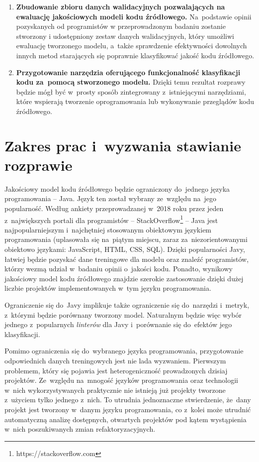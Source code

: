 \documentclass[twoside]{praca}
\begin{document}
\begin{enumerate}
    \item \textbf{Zbudowanie zbioru danych walidacyjnych pozwalających na ewaluację jakościowych modeli kodu źródłowego.} Na~podstawie opinii pozyskanych od programistów w przeprowadzonym badaniu zostanie stworzony i udostępniony zestaw danych walidacyjnych, który umożliwi ewaluację tworzonego modelu, a~także sprawdzenie efektywności dowolnych innych metod starających się poprawnie klasyfikować jakość kodu źródłowego.
    
    \item \textbf{Przygotowanie narzędzia oferującego funkcjonalność klasyfikacji kodu za~pomocą stworzonego modelu.} Dzięki temu rezultat rozprawy będzie mógł być w~prosty sposób zintegrowany z~istniejącymi narzędziami, które wspierają tworzenie oprogramowania lub wykonywanie przeglądów kodu źródłowego.
\end{enumerate}

\section{Zakres prac i~wyzwania stawianie rozprawie}
\label{sec:intro:constraints}

Jakościowy model kodu źródłowego będzie ograniczony do~jednego języka programowania -- Java. Język ten został wybrany ze~względu na~jego popularność. Według ankiety przeprowadzanej w~2018 roku przez jeden z~największych portali dla programistów -- StackOverflow\footnote{https://stackoverflow.com} -- Java jest najpopularniejszym i~najchętniej stosowanym obiektowym językiem programowania \cite{so:survey2018} (uplasowała się na~piątym miejscu, zaraz za~niezorientowanymi obiektowo językami: JavaScript, HTML, CSS, SQL). Dzięki popularności Javy, łatwiej będzie pozyskać dane treningowe dla modelu oraz znaleźć programistów, którzy wezmą udział w~badaniu opinii o~jakości kodu. Ponadto, wynikowy jakościowy model kodu źródłowego znajdzie szerokie zastosowanie dzięki dużej liczbie projektów implementowanych w~tym języku programowania.

Ograniczenie się do~Javy implikuje także ograniczenie się do~narzędzi i~metryk, z~którymi będzie porównany tworzony model. Naturalnym będzie więc wybór jednego z~popularnych \textit{linterów} dla Javy i~porównanie się do~efektów jego klasyfikacji.

Pomimo ograniczenia się do~wybranego języka programowania, przygotowanie odpowiednich danych treningowych jest nie lada wyzwaniem. Pierwszym problemem, który się pojawia jest heterogeniczność prowadzonych dzisiaj projektów. Ze~względu na~mnogość języków programowania oraz technologii w~nich wykorzystywanych praktycznie nie istnieją już projekty tworzone z~użyciem tylko jednego z~nich. To utrudnia jednoznaczne stwierdzenie, że~dany projekt jest tworzony w~danym języku programowania, co z~kolei może utrudnić automatyczną analizę dostępnych, otwartych projektów pod kątem wystąpienia w~nich poszukiwanych zmian refaktoryzacyjnych.
\end{document}

